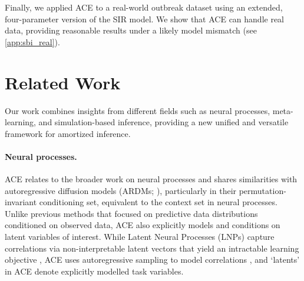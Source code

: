 \documentclass[twoside]{article}
\begin{document}
Finally, we applied ACE to a real-world outbreak dataset \citep{avilov20231978} using an extended, four-parameter version of the SIR model. We show that ACE can handle real data, providing reasonable results under a likely model mismatch (see \cref{app:sbi_real}).

\section{Related Work}
\label{sec:related_work}

\vspace{-0.25em}
Our work combines insights from different fields such as neural processes, meta-learning, and simulation-based inference, providing a new unified and versatile framework for amortized inference.


\vspace{-0.25em}
\paragraph{Neural processes.} 
ACE relates to the broader work on neural processes \citep{garnelo2018neural, garnelo2018conditional, kim2019attentive, gordon2020convolutional, markou2022practical, nguyen2022transformer, huang2023practical} and shares similarities with autoregressive diffusion models (ARDMs; \citealp{hoogeboom2022autoregressive}), particularly in their permutation-invariant conditioning set, equivalent to the context set in neural processes.
Unlike previous methods that focused on predictive data distributions conditioned on observed data, ACE also explicitly models and conditions on latent variables of interest. While Latent Neural Processes (LNPs) capture correlations via non-interpretable latent vectors that yield an intractable learning objective \citep{garnelo2018neural}, ACE uses autoregressive sampling to model correlations \citep{bruinsma2023autoregressive}, and `latents' in ACE denote explicitly modelled task variables.

\vspace{-0.25em}
\end{document}
